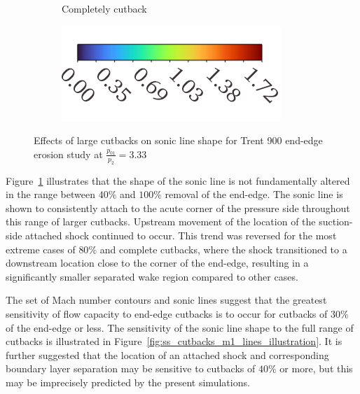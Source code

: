 \documentclass[a4paper, 11pt, oneside]{report}
\begin{document}
\begin{figure}[H]
\begin{subfigure}{.45\textwidth}
		\caption{Completely cutback}
	\end{subfigure}
	\begin{subfigure}{.4\textwidth}
		\centering
		\includegraphics[width=\linewidth]{figs/mach_legend_choked_horizontal.png}
	\end{subfigure}
	\caption{Effects of large cutbacks on sonic line shape for Trent 900 end-edge erosion study at $\frac{p_{01}}{p_2}=3.33$}
	\label{fig:ss_cutbacks_4-10}
\end{figure}

Figure~\ref{fig:ss_cutbacks_4-10} illustrates that the shape of the sonic line is not fundamentally altered in the range between $40\%$ and $100\%$ removal of the end-edge. The sonic line is shown to consistently attach to the acute corner of the pressure side throughout this range of larger cutbacks. Upstream movement of the location of the suction-side attached shock continued to occur. This trend was reversed for the most extreme cases of $80\%$ and complete cutbacks, where the shock transitioned to a downstream location close to the corner of the end-edge, resulting in a significantly smaller separated wake region compared to other cases.

The set of Mach number contours and sonic lines suggest that the greatest sensitivity of flow capacity to end-edge cutbacks is to occur for cutbacks of $30\%$ of the end-edge or less. The sensitivity of the sonic line shape to the full range of cutbacks is illustrated in Figure~\ref{fig:ss_cutbacks_m1_lines_illustration}. It is further suggested that the location of an attached shock and corresponding boundary layer separation may be sensitive to cutbacks of $40\%$ or more, but this may be imprecisely predicted by the present simulations.
\end{document}
